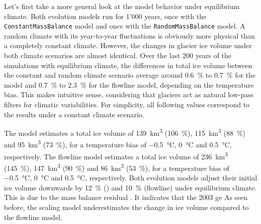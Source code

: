         Let's first take a more general look at the model behavior under equilibrium climate. Both evolution models run for 1'000 years, once with the \lstinline`ConstantMassBalance` model and once with the \lstinline`RandomMassBalance` model. A random climate with its year-to-year fluctuations is obviously more physical than a completely constant climate. However, the changes in glacier ice volume under both climate scenarios are almost identical. Over the last 200 years of the simulations with equilibrium climate, the differences in total ice volume between the constant and random climate scenario average around \SI{0.6}{\percent} to \SI{0.7}{\percent} for the \vas{} model and \SI{0.7}{\percent} to \SI{2.3}{\percent} for the flowline model, depending on the temperature bias. This makes intuitive sense, considering that glaciers act as natural low-pass filters for climatic variabilities. For simplicity, all following values correspond to the results under a constant climate scenario.

      

        The \vas{} model estimates a total ice volume of \SI{139}{\cubic\kilo\meter} (\SI{106}{\percent}), \SI{115}{\cubic\kilo\meter} (\SI{88}{\percent}) and \SI{95}{\cubic\kilo\meter} (\SI{73}{\percent}), for a temperature bias of \SI{-.5}{\celsius}, \SI{0}{\celsius} and \SI{+.5}{\celsius}, respectively. The flowline model estimates a total ice volume of \SI{236}{\cubic\kilo\meter} (\SI{145}{\percent}), \SI{147}{\cubic\kilo\meter} (\SI{90}{\percent}) and \SI{86}{\cubic\kilo\meter} (\SI{53}{\percent}), for a temperature bias of \SI{-.5}{\celsius}, \SI{0}{\celsius} and \SI{+.5}{\celsius}, respectively.
        Both evolution models adjust their initial ice volume downwards by \SI{12}{\percent} (\vas) and \SI{10}{\percent} (flowline) under equilibrium climate. This is due to the mass balance residual \bias{}. It indicates that the 2003 ge
        As seen before, the \vas{} scaling model underestimates the change in ice volume compared to the flowline model. 

